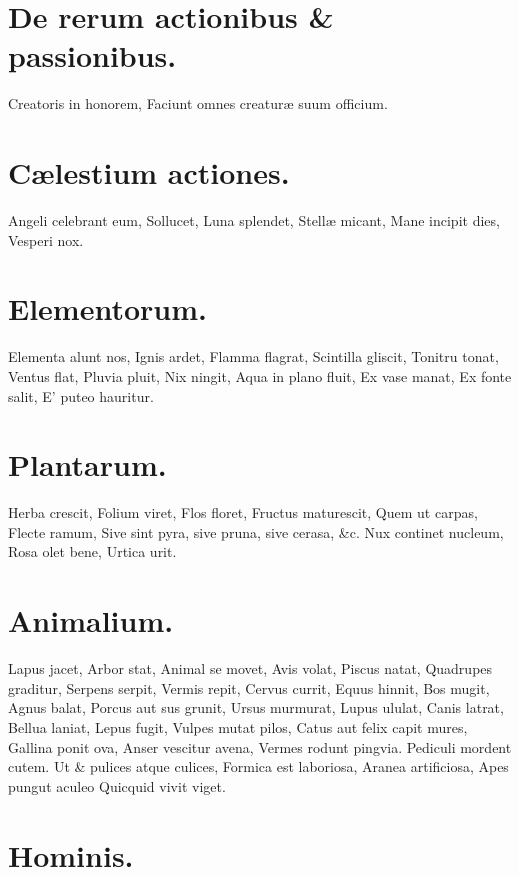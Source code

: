 \documentclass{book}
\begin{document}
\section{De rerum actionibus & passionibus.}

Creatoris in honorem,
Faciunt omnes creaturæ suum officium.

\section{Cælestium actiones.}

Angeli celebrant eum,
Sollucet,
Luna splendet,
Stellæ micant,
Mane incipit dies,
Vesperi nox.

\section{Elementorum.}

Elementa alunt nos,
Ignis ardet,
Flamma flagrat,
Scintilla gliscit,
Tonitru tonat,
Ventus flat,
Pluvia pluit,
Nix ningit,
Aqua in plano fluit,
Ex vase manat,
Ex fonte salit,
E' puteo hauritur.

\section{Plantarum.}

Herba crescit,
Folium viret,
Flos floret,
Fructus maturescit,
Quem ut carpas,
Flecte ramum,
Sive sint pyra, sive pruna, sive cerasa, &c.
Nux continet nucleum,
Rosa olet bene,
Urtica urit.

\section{Animalium.}

Lapus jacet,
Arbor stat,
Animal se movet,
Avis volat,
Piscus natat,
Quadrupes graditur,
Serpens serpit,
Vermis repit,
Cervus currit,
Equus hinnit,
Bos mugit,
Agnus balat,
Porcus aut sus grunit,
Ursus murmurat,
Lupus ululat,
Canis latrat,
Bellua laniat,
Lepus fugit,
Vulpes mutat pilos,
Catus aut felix capit mures,
Gallina ponit ova,
Anser vescitur avena,
Vermes rodunt pingvia.
Pediculi mordent cutem.
Ut & pulices atque culices,
Formica est laboriosa,
Aranea artificiosa,
Apes pungut aculeo 
Quicquid vivit viget.

\section{Hominis.}
\end{document}
